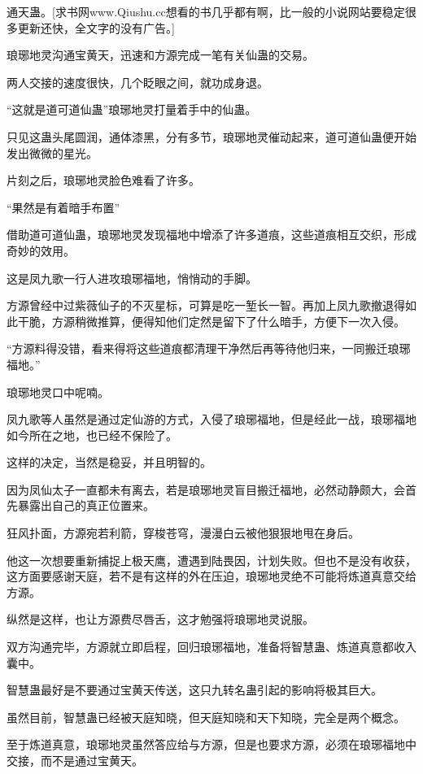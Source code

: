 
\begin{this_body}

通天蛊。[求书网www.Qiushu.cc想看的书几乎都有啊，比一般的小说网站要稳定很多更新还快，全文字的没有广告。]

琅琊地灵沟通宝黄天，迅速和方源完成一笔有关仙蛊的交易。

两人交接的速度很快，几个眨眼之间，就功成身退。

“这就是道可道仙蛊”琅琊地灵打量着手中的仙蛊。

只见这蛊头尾圆润，通体漆黑，分有多节，琅琊地灵催动起来，道可道仙蛊便开始发出微微的星光。

片刻之后，琅琊地灵脸色难看了许多。

“果然是有着暗手布置”

借助道可道仙蛊，琅琊地灵发现福地中增添了许多道痕，这些道痕相互交织，形成奇妙的效用。

这是凤九歌一行人进攻琅琊福地，悄悄动的手脚。

方源曾经中过紫薇仙子的不灭星标，可算是吃一堑长一智。再加上凤九歌撤退得如此干脆，方源稍微推算，便得知他们定然是留下了什么暗手，方便下一次入侵。

“方源料得没错，看来得将这些道痕都清理干净然后再等待他归来，一同搬迁琅琊福地。”

琅琊地灵口中呢喃。

凤九歌等人虽然是通过定仙游的方式，入侵了琅琊福地，但是经此一战，琅琊福地如今所在之地，也已经不保险了。

这样的决定，当然是稳妥，并且明智的。

因为凤仙太子一直都未有离去，若是琅琊地灵盲目搬迁福地，必然动静颇大，会首先暴露出自己的真正位置来。

狂风扑面，方源宛若利箭，穿梭苍穹，漫漫白云被他狠狠地甩在身后。

他这一次想要重新捕捉上极天鹰，遭遇到陆畏因，计划失败。但也不是没有收获，这方面要感谢天庭，若不是有这样的外在压迫，琅琊地灵绝不可能将炼道真意交给方源。

纵然是这样，也让方源费尽唇舌，这才勉强将琅琊地灵说服。

双方沟通完毕，方源就立即启程，回归琅琊福地，准备将智慧蛊、炼道真意都收入囊中。

智慧蛊最好是不要通过宝黄天传送，这只九转名蛊引起的影响将极其巨大。

虽然目前，智慧蛊已经被天庭知晓，但天庭知晓和天下知晓，完全是两个概念。

至于炼道真意，琅琊地灵虽然答应给与方源，但是也要求方源，必须在琅琊福地中交接，而不是通过宝黄天。


\end{this_body}
